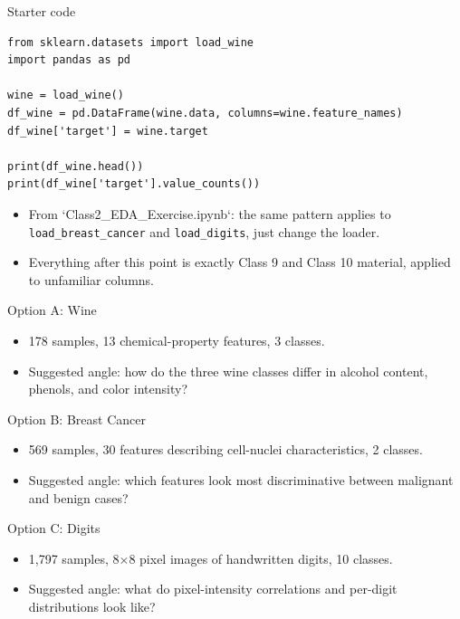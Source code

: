 \begin{frame}[fragile]{Starter code}
\begin{lstlisting}[style=coursepython]
from sklearn.datasets import load_wine
import pandas as pd

wine = load_wine()
df_wine = pd.DataFrame(wine.data, columns=wine.feature_names)
df_wine['target'] = wine.target

print(df_wine.head())
print(df_wine['target'].value_counts())
\end{lstlisting}
\begin{itemize}
\item From `Class2\_EDA\_Exercise.ipynb`: the same pattern applies to \texttt{load\_breast\_cancer} and \texttt{load\_digits}, just change the loader.
\item Everything after this point is exactly Class 9 and Class 10 material, applied to unfamiliar columns.
\end{itemize}
\coursefooter
\end{frame}

\begin{frame}{Option A: Wine}
\begin{itemize}
\item 178 samples, 13 chemical-property features, 3 classes.
\item Suggested angle: how do the three wine classes differ in alcohol content, phenols, and color intensity?
\end{itemize}
\coursefooter
\end{frame}

\begin{frame}{Option B: Breast Cancer}
\begin{itemize}
\item 569 samples, 30 features describing cell-nuclei characteristics, 2 classes.
\item Suggested angle: which features look most discriminative between malignant and benign cases?
\end{itemize}
\coursefooter
\end{frame}

\begin{frame}{Option C: Digits}
\begin{itemize}
\item 1{,}797 samples, 8$\times$8 pixel images of handwritten digits, 10 classes.
\item Suggested angle: what do pixel-intensity correlations and per-digit distributions look like?
\end{itemize}
\coursefooter
\end{frame}

